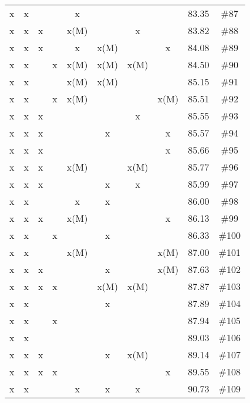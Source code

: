 \begin{longtable}{|c|c|c|c|c|c|c|c|c|c|}
 x    & x    &      &      & x    &      &      &      & 83.35 & \#87 \\
 x    & x    & x    &      & x(M) &      & x    &      & 83.82 & \#88 \\
 x    & x    & x    &      & x    & x(M) &      & x    & 84.08 & \#89 \\
 x    & x    &      & x    & x(M) & x(M) & x(M) &      & 84.50 & \#90 \\
 x    & x    &      &      & x(M) & x(M) &      &      & 85.15 & \#91 \\
 x    & x    &      & x    & x(M) &      &      & x(M) & 85.51 & \#92 \\
 x    & x    & x    &      &      &      & x    &      & 85.55 & \#93 \\
 x    & x    & x    &      &      & x    &      & x    & 85.57 & \#94 \\
 x    & x    & x    &      &      &      &      & x    & 85.66 & \#95 \\
 x    & x    & x    &      & x(M) &      & x(M) &      & 85.77 & \#96 \\
 x    & x    & x    &      &      & x    & x    &      & 85.99 & \#97 \\
 x    & x    &      &      & x    & x    &      &      & 86.00 & \#98 \\
 x    & x    & x    &      & x(M) &      &      & x    & 86.13 & \#99 \\
 x    & x    &      & x    &      & x    &      &      & 86.33 & \#100 \\
 x    & x    &      &      & x(M) &      &      & x(M) & 87.00 & \#101 \\
 x    & x    & x    &      &      & x    &      & x(M) & 87.63 & \#102 \\
 x    & x    & x    & x    &      & x(M) & x(M) &      & 87.87 & \#103 \\
 x    & x    &      &      &      & x    &      &      & 87.89 & \#104 \\
 x    & x    &      & x    &      &      &      &      & 87.94 & \#105 \\
 x    & x    &      &      &      &      &      &      & 89.03 & \#106 \\
 x    & x    & x    &      &      & x    & x(M) &      & 89.14 & \#107 \\
 x    & x    & x    & x    &      &      &      & x    & 89.55 & \#108 \\
 x    & x    &      &      & x    & x    & x    &      & 90.73 & \#109 \\

\end{longtable}
